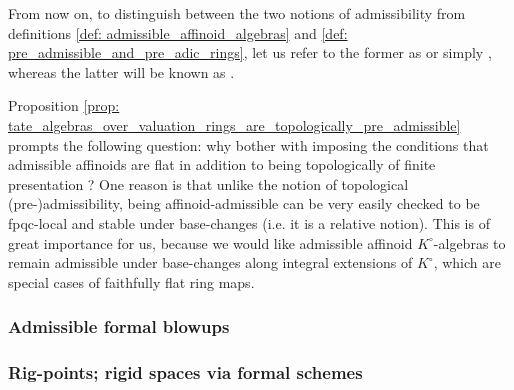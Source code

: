             \begin{convention} \label{conv: admissibility_and_topological_admissibility}
                From now on, to distinguish between the two notions of admissibility from definitions \ref{def: admissible_affinoid_algebras} and \ref{def: pre_admissible_and_pre_adic_rings}, let us refer to the former as  or simply , whereas the latter will be known as .
            \end{convention}
            \begin{remark}
                Proposition \ref{prop: tate_algebras_over_valuation_rings_are_topologically_pre_admissible} prompts the following question: why bother with imposing the conditions that admissible affinoids are flat in addition to being topologically of finite presentation ? One reason is that unlike the notion of topological (pre-)admissibility, being affinoid-admissible can be very easily checked to be fpqc-local and stable under base-changes (i.e. it is a relative notion). This is of great importance for us, because we would like admissible affinoid $K^{\circ}$-algebras to remain admissible under base-changes along integral extensions of $K^{\circ}$, which are special cases of faithfully flat ring maps. 
            \end{remark}
        
        \subsubsection{Admissible formal blowups}
        
        \subsubsection{Rig-points; rigid spaces via formal schemes}